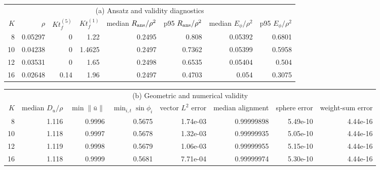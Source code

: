 \begin{tabular}{rrrrrrrr}
\multicolumn{8}{c}{(a) Ansatz and validity diagnostics}\\
$K$ & $\rho$ & $Kt_f^{(5)}$ & $Kt_f^{(1)}$ & median $R_{\rm ans}/\rho^2$ & p95 $R_{\rm ans}/\rho^2$ & median $E_\phi/\rho^2$ & p95 $E_\phi/\rho^2$\\
\hline
8 & 0.05297 & 0 & 1.22 & 0.2495 & 0.808 & 0.05392 & 0.6801\\
10 & 0.04238 & 0 & 1.4625 & 0.2497 & 0.7362 & 0.05399 & 0.5958\\
12 & 0.03531 & 0 & 1.65 & 0.2498 & 0.6535 & 0.05404 & 0.504\\
16 & 0.02648 & 0.14 & 1.96 & 0.2497 & 0.4703 & 0.054 & 0.3075\\
\end{tabular}
\vspace{0.6em}
\begin{tabular}{rrrrrrrr}
\multicolumn{8}{c}{(b) Geometric and numerical validity}\\
$K$ & median $D_u/\rho$ & $\min\|\bar u\|$ & $\min_{i,t}\sin\phi_i$ & vector $L^2$ error & median alignment & sphere error & weight-sum error\\
\hline
8 & 1.116 & 0.9996 & 0.5675 & 1.74e-03 & 0.99999898 & 5.49e-10 & 4.44e-16\\
10 & 1.118 & 0.9997 & 0.5678 & 1.32e-03 & 0.99999935 & 5.05e-10 & 4.44e-16\\
12 & 1.119 & 0.9998 & 0.5679 & 1.06e-03 & 0.99999955 & 5.15e-10 & 4.44e-16\\
16 & 1.118 & 0.9999 & 0.5681 & 7.71e-04 & 0.99999974 & 5.30e-10 & 4.44e-16\\
\end{tabular}
